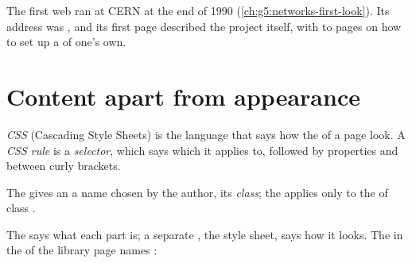 \label{lst:g9:html-and-css:count}

\label{out:g9:html-and-css:count}

\begin{history}
The first web  ran at CERN at the end of 1990
(\cref{ch:g5:networks-first-look}). Its address was , and
its first page described the  project itself, with  to
pages on how to set up a  of one's own.
\end{history}

\section{Content apart from appearance}

\begin{definition}\label{def:g9:html-and-css:css}\label{def:g9:html-and-css:rule}\label{def:g9:html-and-css:selector}
\emph{CSS} (Cascading Style Sheets) is the language that says how
the  of a page look. A \emph{CSS rule} is a
\emph{selector}, which says which  it applies
to, followed by properties and  between curly brackets.
\end{definition}

\begin{definition}\label{def:g9:html-and-css:class}
The   gives an  a name chosen by the author, its
\emph{class}; the 
 applies only to the   of class .
\end{definition}

The  says what each part is; a separate  , the style sheet, says
how it looks. The  in the  of the library page names
:

